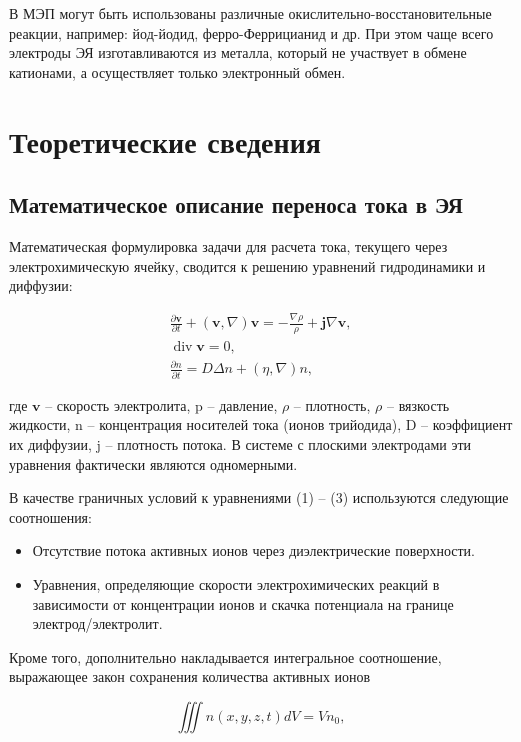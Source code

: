\documentclass[a4paper,12pt]{article}
\begin{document}
В МЭП могут быть использованы различные окислительно-восстановительные реакции, например: йод-йодид, ферро-Феррицианид и др. При этом чаще всего электроды ЭЯ изготавливаются из металла, который не участвует в обмене катионами, а осуществляет только электронный обмен.

\section{Теоретические сведения}

\subsection{Математическое описание переноса тока в ЭЯ}

Математическая формулировка задачи для расчета тока, текущего через электрохимическую ячейку, сводится к решению уравнений гидродинамики и диффузии:

\begin{gather}
\frac{\partial \mathbf{v}}{\partial t} + (\mathbf{v}, \nabla)\mathbf{v} = -\frac{\nabla \rho}{\rho} + \mathbf{j} \nabla \mathbf{v},  \\
%
\operatorname{div} \mathbf{v} = 0, \\
%
\frac{\partial n}{\partial t} = D \Delta n + (\eta, \nabla)n,
\end{gather}

где $\mathbf{v}$ -- скорость электролита, p -- давление, $\rho$ -- плотность, $\rho$ -- вязкость жидкости, n -- концентрация носителей тока (ионов трийодида), D -- коэффициент их диффузии, j -- плотность потока. В системе с плоскими электродами эти уравнения фактически являются одномерными.

В качестве граничных условий к уравнениями (1) -- (3) используются следующие соотношения:

\begin{itemize}
\item Отсутствие потока активных ионов через диэлектрические поверхности.
\item Уравнения, определяющие скорости электрохимических реакций в зависимости от
концентрации ионов и скачка потенциала на границе электрод/электролит.
\end{itemize}

Кроме того, дополнительно накладывается интегральное соотношение, выражающее закон сохранения количества активных ионов

\begin{equation}
	\iiint n(x, y, z, t) dV = V n_0,
\end{equation}
\end{document}
